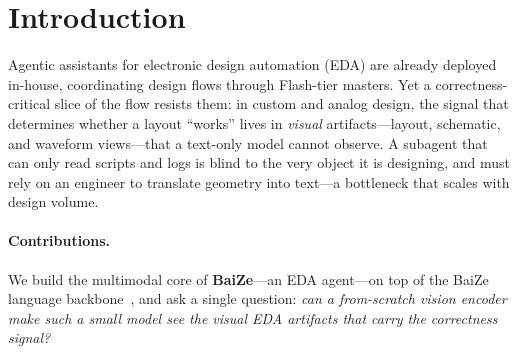 \section{Introduction}

Agentic assistants for electronic design automation (EDA) are already deployed in-house, coordinating design flows through Flash-tier masters.
Yet a correctness-critical slice of the flow resists them: in custom and analog design, the signal that determines whether a layout ``works'' lives in \emph{visual} artifacts---layout, schematic, and waveform views---that a text-only model cannot observe.
A subagent that can only read scripts and logs is blind to the very object it is designing, and must rely on an engineer to translate geometry into text---a bottleneck that scales with design volume.

\paragraph{Contributions.}
We build the multimodal core of \textbf{BaiZe}---an EDA agent---on top of the BaiZe language backbone~\cite{baiZe-llm}, and ask a single question: \emph{can a from-scratch vision encoder make such a small model see the visual EDA artifacts that carry the correctness signal?}

